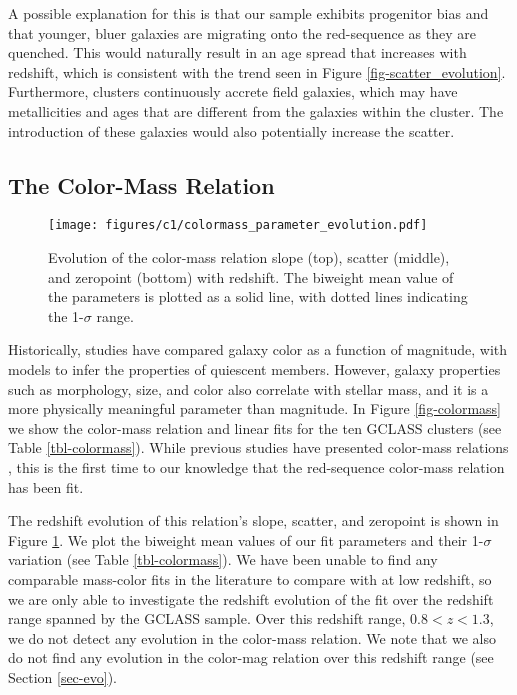 A possible explanation for this is that our sample exhibits progenitor bias \citep{2000ApJ...541...95V,2001ASPC..230..581F} and that younger, bluer galaxies are migrating onto the red-sequence as they are quenched. This would naturally result in an age spread that increases with redshift, which is consistent with the trend seen in Figure \ref{fig-scatter_evolution}. Furthermore, clusters continuously accrete field galaxies, which may have metallicities and ages that are different from the galaxies within the cluster. The introduction of these galaxies would also potentially increase the scatter.

\subsection{The Color-Mass Relation}\label{sec-colormass}

\begin{figure}[t]
\texttt{[image: figures/c1/colormass\_parameter\_evolution.pdf]}
\caption[Evolution of the color-mass relation slope, scatter, and zeropoint with redshift]{Evolution of the color-mass relation slope (top), scatter (middle), and zeropoint (bottom) with redshift. The biweight mean value of the parameters is plotted as a solid line, with dotted lines indicating the 1-$\sigma$ range.\label{fig-massparams}}
\end{figure}

Historically, studies have compared galaxy color as a function of magnitude, with models to infer the properties of quiescent members. However, galaxy properties such as morphology, size, and color also correlate with stellar mass, and it is a more physically meaningful parameter than magnitude. In Figure \ref{fig-colormass} we show the color-mass relation and linear fits for the ten GCLASS clusters (see Table \ref{tbl-colormass}). While previous studies have presented color-mass relations \citep{Borch:2006aa,Cardamone:2010aa,Huertas-Company:2010aa,Strazzullo:2010kh,Bassett:2013hq,Cimatti:2013aa,Moresco:2013aa}, this is the first time to our knowledge that the red-sequence color-mass relation has been fit.

The redshift evolution of this relation's slope, scatter, and zeropoint is shown in Figure \ref{fig-massparams}. We plot the biweight mean values of our fit parameters and their 1-$\sigma$ variation (see Table \ref{tbl-colormass}). We have been unable to find any comparable mass-color fits in the literature to compare with at low redshift, so we are only able to investigate the redshift evolution of the fit over the redshift range spanned by the GCLASS sample. Over this redshift range, $0.8 < z < 1.3$, we do not detect any evolution in the color-mass relation. We note that we also do not find any evolution in the color-mag relation over this redshift range (see Section \ref{sec-evo}).


